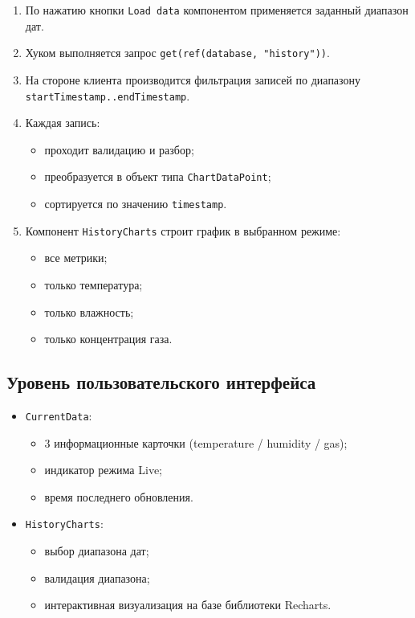 \begin{enumerate}
    \item По нажатию кнопки \texttt{Load data} компонентом применяется заданный диапазон дат.
    \item Хуком выполняется запрос \texttt{get(ref(database, "history"))}.
    \item На стороне клиента производится фильтрация записей по диапазону \texttt{startTimestamp\allowbreak..\allowbreak endTimestamp}.
    \item Каждая запись:
    \begin{itemize}
        \item проходит валидацию и разбор;
        \item преобразуется в объект типа \texttt{ChartDataPoint};
        \item сортируется по значению \texttt{timestamp}.
    \end{itemize}
    \item Компонент \texttt{HistoryCharts} строит график в выбранном режиме:
    \begin{itemize}
        \item все метрики;
        \item только температура;
        \item только влажность;
        \item только концентрация газа.
    \end{itemize}
\end{enumerate}

\subsection{Уровень пользовательского интерфейса}

\begin{itemize}
    \item \texttt{CurrentData}:
    \begin{itemize}
        \item 3 информационные карточки (temperature / humidity / gas);
        \item индикатор режима Live;
        \item время последнего обновления.
    \end{itemize}
    \item \texttt{HistoryCharts}:
    \begin{itemize}
        \item выбор диапазона дат;
        \item валидация диапазона;
        \item интерактивная визуализация на базе библиотеки Recharts.
    \end{itemize}
\end{itemize}

